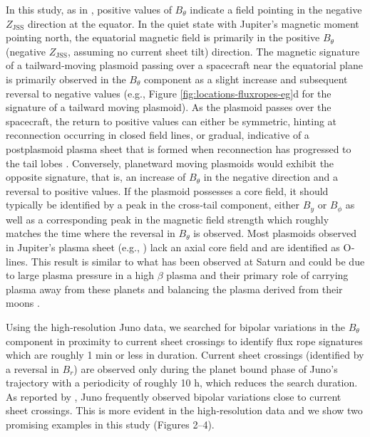 In this study, as in , positive values of $B_\theta$ indicate a field pointing in the negative $Z_\text{JSS}$ direction at the equator. In the quiet state with Jupiter's magnetic moment pointing north, the equatorial magnetic field is primarily in the positive $B_\theta$ (negative $Z_\text{JSS}$, assuming no current sheet tilt) direction. The magnetic signature of a tailward‐moving plasmoid passing over a spacecraft near the equatorial plane is primarily observed in the $B_\theta$ component as a slight increase and subsequent reversal to negative values (e.g., Figure \ref{fig:locations-fluxropes-eg}d for the signature of a tailward moving plasmoid). As the plasmoid passes over the spacecraft, the return to positive values can either be symmetric, hinting at reconnection occurring in closed field lines, or gradual, indicative of a postplasmoid plasma sheet that is formed when reconnection has progressed to the tail lobes \cite{Jackman2011CassiniSaturn,Jia2012}. Conversely, planetward moving plasmoids would exhibit the opposite signature, that is, an increase of $B_\theta$ in the negative direction and a reversal to positive values. If the plasmoid possesses a core field, it should typically be identified by a peak in the cross‐tail component, either $B_y$ or $B_\phi$ as well as a corresponding peak in the magnetic field strength which roughly matches the time where the reversal in $B_\theta$ is observed. Most plasmoids observed in Jupiter's plasma sheet (e.g., ) lack an axial core field and are identified as O‐lines. This result is similar to what has been observed at Saturn \cite{Jackman2011CassiniSaturn} and could be due to large plasma pressure in a high $\beta$ plasma and their primary role of carrying plasma away from these planets and balancing the plasma derived from their moons \cite{Cowley2015Down-tailMagnetospheres,Kivelson1995ModelsPlasmas}.

Using the high‐resolution Juno data, we searched for bipolar variations in the $B_\theta$ component in proximity to current sheet crossings to identify flux rope signatures which are roughly 1 min or less in duration. Current sheet crossings (identified by a reversal in $B_r$) are observed only during the planet bound phase of Juno's trajectory with a periodicity of roughly 10 h, which reduces the search duration. As reported by \cite{Vogt2020MagnetotailObservations}, Juno frequently observed bipolar variations close to current sheet crossings. This is more evident in the high‐resolution data and we show two promising examples in this study (Figures 2–4). 

